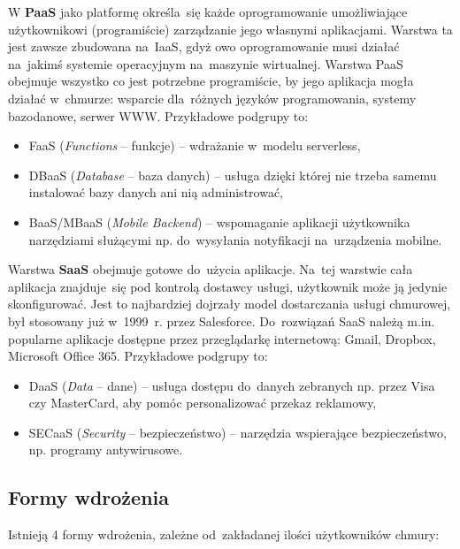 \documentclass[12pt,a4paper,twoside,titlepage,openright]{book}
\begin{document}
W \textbf{PaaS} jako platformę określa~się każde oprogramowanie umożliwiające użytkownikowi (programiście) zarządzanie jego własnymi aplikacjami. Warstwa ta jest zawsze zbudowana na~IaaS, gdyż owo oprogramowanie musi działać na~jakimś systemie operacyjnym na~maszynie wirtualnej. Warstwa PaaS obejmuje wszystko co jest potrzebne programiście, by jego aplikacja mogła działać w~chmurze: wsparcie dla~różnych języków programowania, systemy bazodanowe, serwer WWW. Przykładowe podgrupy to:
\begin{itemize}
\item FaaS (\textit{Functions} -- funkcje) -- wdrażanie w~modelu serverless,
\item DBaaS (\textit{Database} -- baza danych) -- usługa dzięki której nie trzeba samemu instalować bazy danych ani nią administrować,
\item BaaS/MBaaS (\textit{Mobile Backend}) -- wspomaganie aplikacji użytkownika narzędziami służącymi np. do~wysyłania notyfikacji na~urządzenia mobilne.
\end{itemize}

Warstwa \textbf{SaaS} obejmuje gotowe do~użycia aplikacje. Na~tej warstwie cała aplikacja znajduje~się pod kontrolą dostawcy usługi, użytkownik może ją jedynie skonfigurować. Jest to najbardziej dojrzały model dostarczania usługi chmurowej, był stosowany już w~1999~r. przez Salesforce. Do~rozwiązań SaaS należą m.in. popularne aplikacje dostępne przez przeglądarkę internetową: Gmail, Dropbox, Microsoft Office 365. Przykładowe podgrupy to:
\begin{itemize}
\item DaaS (\textit{Data} -- dane) -- usługa dostępu do~danych zebranych np. przez Visa czy MasterCard, aby pomóc personalizować przekaz reklamowy,
\item SECaaS (\textit{Security} -- bezpieczeństwo) -- narzędzia wspierające bezpieczeństwo, np. programy antywirusowe.
\end{itemize}

\subsection{Formy wdrożenia}

Istnieją 4 formy wdrożenia, zależne od~zakładanej ilości użytkowników chmury:
\end{document}
